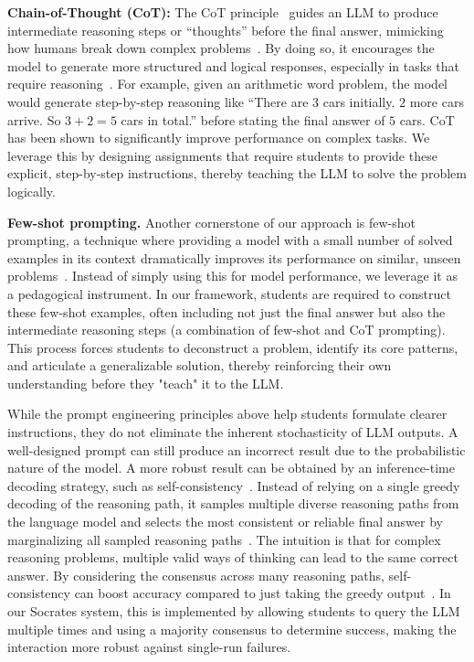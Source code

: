 \documentclass{article} %
\begin{document}
\textbf{Chain-of-Thought (CoT):} The CoT principle~\citep{wei2022chain,kojima2022large} guides an LLM to produce intermediate reasoning steps or ``thoughts'' before the final answer,
mimicking how humans break down complex problems~\citep{zhou2022least}. By doing so, it encourages the
model to generate more structured and logical responses, especially in tasks
that require reasoning~\citep{chu2023survey, wei2022chain}. For example, given an
arithmetic word problem, the model would generate step-by-step reasoning like
``There are $3$ cars initially. $2$ more cars arrive. So $3 + 2 = 5$ cars in total.''
before stating the final answer of $5$ cars. CoT has been shown to significantly improve performance on complex tasks. We leverage this by designing assignments that require students to provide these explicit, step-by-step instructions, thereby teaching the LLM to solve the problem logically.

\textbf{Few-shot prompting.} Another cornerstone of our approach is few-shot prompting, a technique where providing a model with a small number of solved examples in its context dramatically improves its performance on similar, unseen problems~\citep{Brown2020LanguageMA}. Instead of simply using this for model performance, we leverage it as a pedagogical instrument. In our framework, students are required to construct these few-shot examples, often including not just the final answer but also the intermediate reasoning steps (a combination of few-shot and CoT prompting). This process forces students to deconstruct a problem, identify its core patterns, and articulate a generalizable solution, thereby reinforcing their own understanding before they "teach" it to the LLM.

While the prompt engineering principles above help students formulate clearer instructions, they do not eliminate the inherent stochasticity of LLM outputs. A well-designed prompt can still produce an incorrect result due to the probabilistic nature of the model. A more robust result can be obtained by an inference-time decoding strategy, such as self-consistency~\citep{wang2022self}. Instead of relying on a single greedy decoding of the reasoning path, it samples multiple diverse
reasoning paths from the language model and selects the most consistent or reliable final
answer by marginalizing all sampled reasoning paths~\citep{bartsch-etal-2023-self, min2023beyond}. The intuition is that
for complex reasoning problems, multiple valid ways of thinking can lead to the
same correct answer. By considering the consensus across many reasoning paths,
self-consistency can boost accuracy compared to just taking the greedy output~\citep{chen2023universal}.
In our \textsf{Socrates} system, this is implemented by allowing students to query the LLM multiple times and using a majority consensus to determine success, making the interaction more robust against single-run failures.
\end{document}
